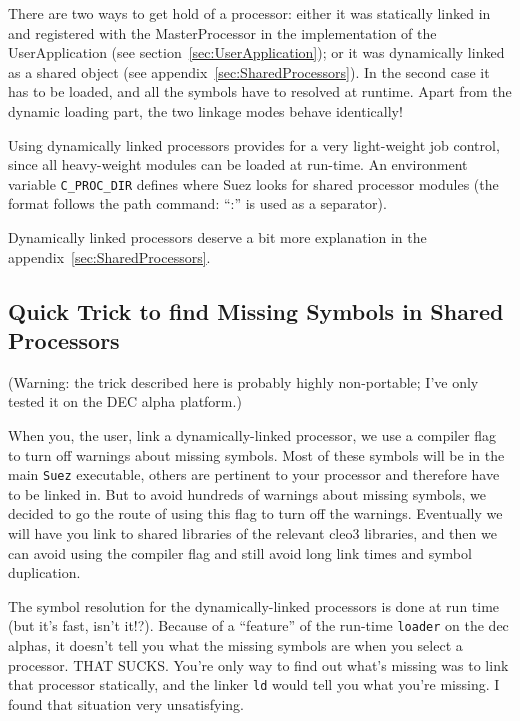 \documentclass[12pt]{article}
\begin{document}
There are two ways to get hold of a processor: either it was statically
linked in and registered with the MasterProcessor in the
implementation of the UserApplication (see
section~\ref{sec:UserApplication}); or it was dynamically linked as a
shared object (see appendix~\ref{sec:SharedProcessors}). In the second
case it has to be loaded, and all the symbols have to resolved at
runtime.
Apart from the dynamic loading part, the two linkage modes behave identically!

Using dynamically linked processors provides for a very light-weight job
control, since all heavy-weight modules can be loaded at run-time.
An environment variable \texttt{C\_PROC\_DIR} defines where Suez looks for
shared processor modules (the format follows the path command: ``:'' is
used as a separator).

Dynamically linked processors deserve a bit more explanation in the
appendix~\ref{sec:SharedProcessors}.


\subsection{Quick Trick to find Missing Symbols in Shared Processors}
\label{sec:MissingSymbolsInSharedProcessors}

(Warning: the trick described here is probably highly non-portable; I've
only tested it on the DEC alpha platform.)

When you, the user, link a dynamically-linked processor, we use a
compiler flag to turn off warnings about missing symbols. Most of these
symbols will be in the main \texttt{Suez} executable, others are
pertinent to your processor and therefore have to be linked in. But to
avoid hundreds of warnings about missing symbols, we decided to go the
route of using this flag to turn off the warnings. Eventually we will
have you link to shared libraries of the relevant cleo3 libraries, and
then we can avoid using the compiler flag and still avoid long link
times and symbol duplication.

The symbol resolution for the dynamically-linked processors is done at
run time (but it's fast, isn't it!?). Because of a ``feature'' of the
run-time \texttt{loader} on the dec alphas, it doesn't tell you what the
missing symbols are when you select a processor. THAT SUCKS. You're only
way to find out what's missing was to link that processor statically,
and the linker \texttt{ld} would tell you what you're missing. I found
that situation very unsatisfying.
\end{document}
